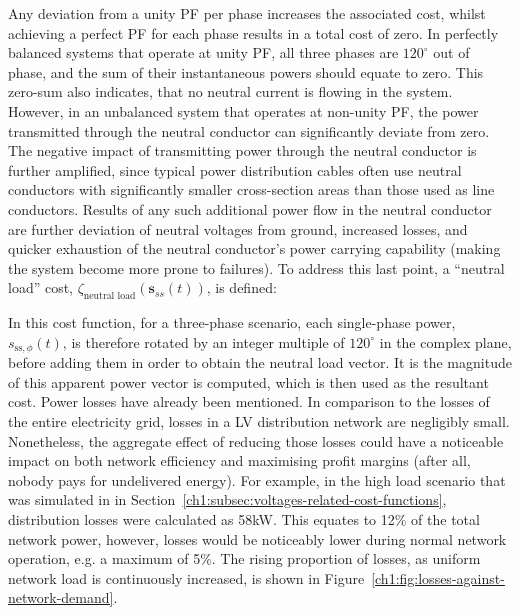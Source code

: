 


Any deviation from a unity PF per phase increases the associated cost, whilst achieving a perfect PF for each phase results in a total cost of zero.
In perfectly balanced systems that operate at unity PF, all three phases are $120^\circ$ out of phase, and the sum of their instantaneous powers should equate to zero.
This zero-sum also indicates, that no neutral current is flowing in the system.
However, in an unbalanced system that operates at non-unity PF, the power transmitted through the neutral conductor can significantly deviate from zero.
The negative impact of transmitting power through the neutral conductor is further amplified, since typical power distribution cables often use neutral conductors with significantly smaller cross-section areas than those used as line conductors.
Results of any such additional power flow in the neutral conductor are further deviation of neutral voltages from ground, increased losses, and quicker exhaustion of the neutral conductor's power carrying capability (making the system become more prone to failures).
To address this last point, a ``neutral load'' cost, $\zeta_\text{neutral load}(\textbf{s}_{ss}(t))$, is defined:



In this cost function, for a three-phase scenario, each single-phase power, $s_{\text{ss},\phi}(t)$, is therefore rotated by an integer multiple of $120^\circ$ in the complex plane, before adding them in order to obtain the neutral load vector.
It is the magnitude of this apparent power vector is computed, which is then used as the resultant cost.
Power losses have already been mentioned.
In comparison to the losses of the entire electricity grid, losses in a LV distribution network are negligibly small.
Nonetheless, the aggregate effect of reducing those losses could have a noticeable impact on both network efficiency and maximising profit margins (after all, nobody pays for undelivered energy).
For example, in the high load scenario that was simulated in in Section~\ref{ch1:subsec:voltages-related-cost-functions}, distribution losses were calculated as 58kW.
This equates to 12\% of the total network power, however, losses would be noticeably lower during normal network operation, e.g. a maximum of 5\%.
The rising proportion of losses, as uniform network load is continuously increased, is shown in Figure~\ref{ch1:fig:losses-against-network-demand}.

